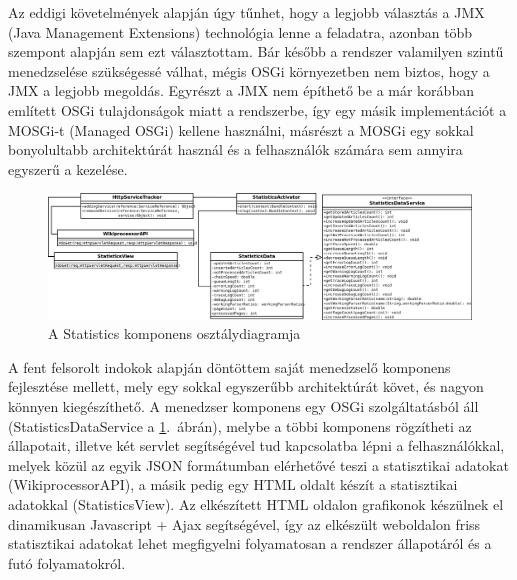 Az eddigi követelmények alapján úgy tűnhet, hogy a legjobb választás a JMX (Java Management Extensions) technológia lenne a feladatra, azonban több szempont alapján sem ezt választottam. Bár később a rendszer valamilyen szintű menedzselése szükségessé válhat, mégis OSGi környezetben nem biztos, hogy a JMX a legjobb megoldás. Egyrészt a JMX nem építhető be a már korábban említett OSGi tulajdonságok miatt a rendszerbe, így egy másik implementációt a MOSGi-t (Managed OSGi) kellene használni, másrészt a MOSGi egy sokkal bonyolultabb architektúrát használ és a felhasználók számára sem annyira egyszerű a kezelése.

\begin{figure}[htp]
\centering
\includegraphics[scale=0.3]{img/class_statistics}
\caption{A Statistics komponens osztálydiagramja}
\label{fig:class_statistics}
\end{figure}

A fent felsorolt indokok alapján döntöttem saját menedzselő komponens fejlesztése mellett, mely egy sokkal egyszerűbb architektúrát követ, és nagyon könnyen kiegészíthető. A menedzser komponens egy OSGi szolgáltatásból áll (StatisticsDataService a \ref{fig:class_statistics}.~ábrán), melybe a többi komponens rögzítheti az állapotait, illetve két servlet segítségével tud kapcsolatba lépni a felhasználókkal, melyek közül az egyik JSON formátumban elérhetővé teszi a statisztikai adatokat (WikiprocessorAPI), a másik pedig egy HTML oldalt készít a statisztikai adatokkal (StatisticsView). Az elkészített HTML oldalon grafikonok készülnek el dinamikusan Javascript + Ajax segítségével, így az elkészült weboldalon friss statisztikai adatokat lehet megfigyelni folyamatosan a rendszer állapotáról és a futó folyamatokról.

